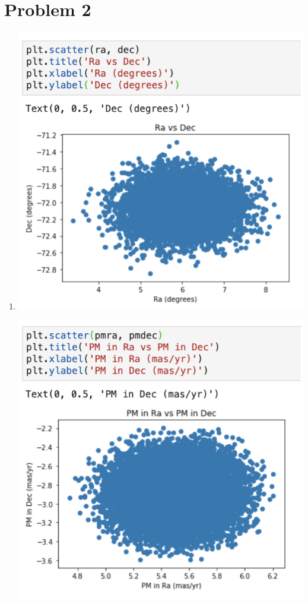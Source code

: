 \documentclass[11pt,letterpaper]{article}
\begin{document}
\section*{Problem 2}
\begin{enumerate}[label=(\roman*)]
    \item \hfill

        \begin{parbox}{\linewidth}{
                \centering
                \begin{minipage}[b]{0.45\textwidth}
                    \includegraphics[width=\linewidth]{figures/q21pos.png}
                \end{minipage}
                \hfill
                \begin{minipage}[b]{0.45\textwidth}
                    \includegraphics[width=\linewidth]{figures/q21pm.png}

\end{minipage}}
\end{parbox}
\end{enumerate}
\end{document}
